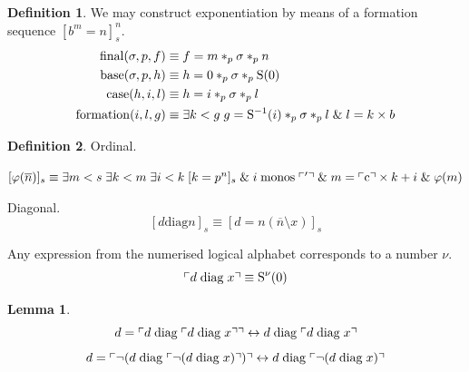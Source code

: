 \documentclass{amsbook}
\newcommand{\exis}[1]{\mathord\exists#1\;}
\newcommand{\conj}{\mathrel\&}
\newcommand{\eqv}{\mathrel\leftrightarrow}
\theoremstyle{definition}
\newtheorem{lmm}{Lemma}[section]
\newtheorem{dfn}{Definition}[section]
\begin{document}
\begin{dfn}
    We may construct exponentiation by means of a formation sequence $[b^m = n]_s^n$.
    \begin{align*}
        \mathrm{final}(\sigma, p, f)     \equiv\;       & f = m *_p \sigma *_p n                                              \\
        \mathrm{base}(\sigma, p, h)            \equiv\; & h = 0 *_p \sigma *_p \suc(0)                                        \\
        \mathrm{case}(h, i, l)\equiv\;                  & h = i *_p \sigma *_p l                                              \\
        \mathrm{formation}(i, l, g) \equiv\;            & \exis{k < g} g = \suc^{-1}(i) *_p \sigma *_p l \conj l = k \times b
    \end{align*}
\end{dfn}

\newcommand{\diag}{\mathrel{\mathrm{diag}}}

\begin{dfn}
    Ordinal.

    $[\varphi(\overline n)]_s \equiv \exis{m < s}\exis{k < m}\exis{i < k} [k = p^n]_s \conj i \monos \ord{'}\\
        \conj m = \ord{\mathrm c} \times k + i \conj \varphi(m)$

    Diagonal.
    $$[d \mathrel{\mathrm{diag}} n]_s \equiv [d = n(\overline n \setminus x)]_s$$

    Any expression from the numerised logical alphabet corresponds to a  number $\nu$.
    $$\ord{d \diag x} \equiv \suc^\nu(0)$$
\end{dfn}

\begin{lmm}
    $$d = \ord{d \diag \ord{d \diag x}} \eqv d \diag \ord{d \diag x}$$
    $$d = \ord{\neg(d \diag \ord{\neg(d \diag x)})} \eqv d \diag \ord{\neg(d \diag x)}$$
\end{lmm}
\end{document}
